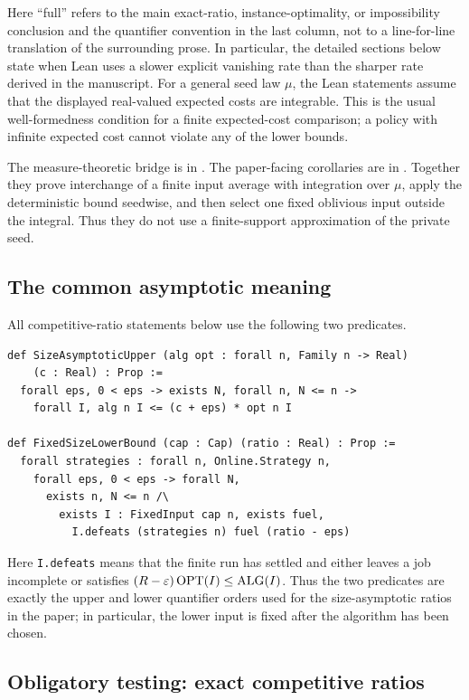Here ``full'' refers to the main exact-ratio, instance-optimality, or
impossibility conclusion and the quantifier convention in the last column,
not to a line-for-line translation of the surrounding prose.  In particular,
the detailed sections below state when Lean uses a slower explicit vanishing
rate than the sharper rate derived in the manuscript.
For a general seed law $\mu$, the Lean statements assume that the displayed
real-valued expected costs are integrable.  This is the usual well-formedness
condition for a finite expected-cost comparison; a policy with infinite
expected cost cannot violate any of the lower bounds.

The measure-theoretic bridge is in
.  The paper-facing corollaries are in
.  Together they prove interchange of a
finite input average with integration over $\mu$, apply the deterministic
bound seedwise, and then select one fixed oblivious input outside the
integral.  Thus they do not use a finite-support approximation of the private
seed.

\subsection{The common asymptotic meaning}

All competitive-ratio statements below use the following two predicates.

\begin{lstlisting}[style=lean]
def SizeAsymptoticUpper (alg opt : forall n, Family n -> Real)
    (c : Real) : Prop :=
  forall eps, 0 < eps -> exists N, forall n, N <= n ->
    forall I, alg n I <= (c + eps) * opt n I

def FixedSizeLowerBound (cap : Cap) (ratio : Real) : Prop :=
  forall strategies : forall n, Online.Strategy n,
    forall eps, 0 < eps -> forall N,
      exists n, N <= n /\
        exists I : FixedInput cap n, exists fuel,
          I.defeats (strategies n) fuel (ratio - eps)
\end{lstlisting}

Here \texttt{I.defeats} means that the finite run has settled and either
leaves a job incomplete or satisfies
\((R-\varepsilon)\operatorname{OPT}(I)\le\operatorname{ALG}(I)\).  Thus the two predicates are exactly the
upper and lower quantifier orders used for the size-asymptotic ratios in the
paper; in particular, the lower input is fixed after the algorithm has been
chosen.

\subsection{Obligatory testing: exact competitive ratios}

